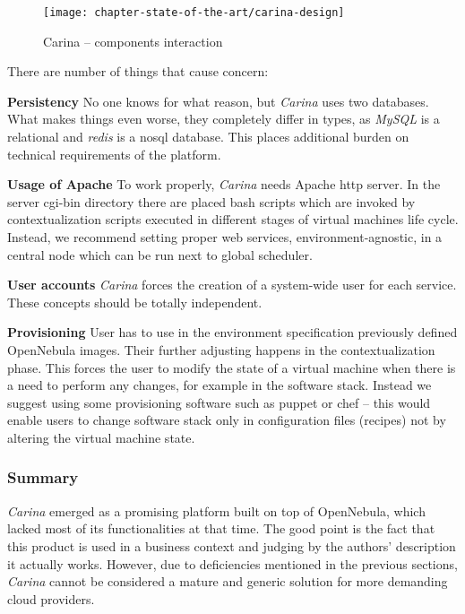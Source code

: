 \begin{figure}[!ht]
  \begin{center}
    \texttt{[image: chapter-state-of-the-art/carina-design]}
  \end{center}
  \caption{Carina -- components interaction}
  \label{sota:carina-design}
\end{figure}

There are number of things that cause concern:
\begin{asparaenum}
\item[\textbf{Persistency}] No one knows for what reason, but \emph{Carina} uses two databases. What makes things even worse, they completely differ in types, as \emph{MySQL} is a relational and \emph{redis} is a nosql database. This places additional burden on technical requirements of the platform.
\item[\textbf{Usage of Apache}] To work properly, \emph{Carina} needs Apache http server. In the server cgi-bin directory there are placed bash scripts which are invoked by contextualization scripts executed in different stages of virtual machines life cycle. Instead, we recommend setting proper web services, environment-agnostic, in a central node which can be run next to global scheduler.
\item[\textbf{User accounts}] \emph{Carina} forces the creation of a system-wide user for each service. These concepts should be totally independent.
\item[\textbf{Provisioning}] User has to use in the environment specification previously defined OpenNebula images. Their further adjusting happens in the contextualization phase. This forces the user to modify the state of a virtual machine when there is a need to perform any changes, for example in the software stack. Instead we suggest using some provisioning software such as puppet or chef -- this would enable users to change software stack only in configuration files (recipes) not by altering the virtual machine state.
\end{asparaenum}

\subsubsection{Summary}
\emph{Carina} emerged as a promising platform built on top of OpenNebula, which lacked most of its functionalities at that time. The good point is the fact that this product is used in a business context and judging by the authors' description it actually works. However, due to deficiencies mentioned in the previous sections, \emph{Carina} cannot be considered a mature and generic solution for more demanding cloud providers.


